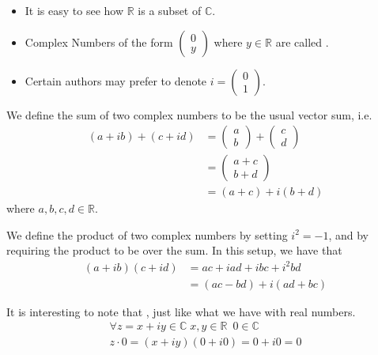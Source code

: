 \documentclass[notoc,notitlepage]{tufte-book}
\begin{document}
\begin{note}
	\begin{itemize}
		\item It is easy to see how $\mathbb{R}$ is a subset of $\mathbb{C}$.
		\item Complex Numbers of the form $\left(\begin{smallmatrix} 0 \\ y \end{smallmatrix}\right)$ where $y \in \mathbb{R}$ are called .
		\item Certain authors may prefer to denote $i = \left(\begin{smallmatrix} 0 \\ 1 \end{smallmatrix}\right)$.
	\end{itemize}
\end{note}

\begin{defn}\label{defn:Sum and Product}
	We define the sum of two complex numbers to be the usual vector sum, i.e.
	\begin{align*}
		(a + ib) + (c + id) &= \begin{pmatrix} a \\ b \end{pmatrix} + \begin{pmatrix} c \\ d \end{pmatrix} \\
											&= \begin{pmatrix} a + c \\ b + d \end{pmatrix} \\
											&= (a + c) + i (b + d)
	\end{align*}
	where $a, b, c, d \in \mathbb{R}$.

	We define the product of two complex numbers by setting $i^2 = -1$, and by requiring the product to be  over the sum. In this setup, we have that
	\begin{align}
		(a + ib)(c + id) &= ac + iad + ibc + i^2 bd \nonumber \\
						 &= (ac - bd) + i (ad + bc) \label{eq:complex multiplication}
	\end{align}
\end{defn}

\begin{note}
 It is interesting to note that , just like what we have with real numbers.
 \begin{gather*}
 	\forall z = x + iy \in \mathbb{C} \; x, y \in \mathbb{R} \enspace 0 \in \mathbb{C} \\
 	z \cdot 0 = (x + iy)(0 + i0) = 0 + i0 = 0
 \end{gather*}
\end{note}
\end{document}
